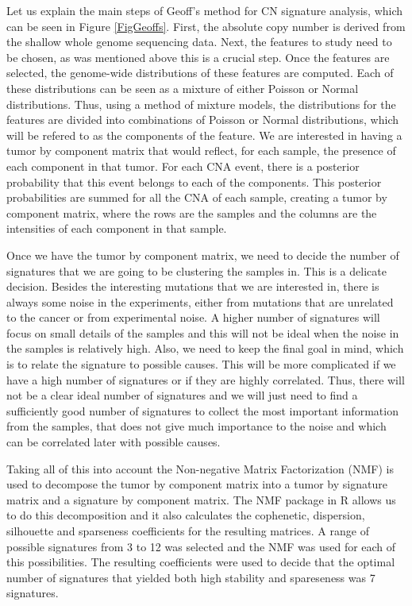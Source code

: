 \documentclass[a4paper]{article}
\begin{document}
Let us explain the main steps of Geoff's method for CN signature analysis, which can be seen in Figure \ref{FigGeoffs}. First, the absolute copy number is derived from the shallow whole genome sequencing data. Next, the features to study need to be chosen, as was mentioned above this is a crucial step. Once the features are selected, the genome-wide distributions of these features are computed. Each of these distributions can be seen as a mixture of either Poisson or Normal distributions. Thus, using a method of mixture models, the distributions for  the features are divided into combinations of Poisson or Normal distributions, which will be refered to as the components of the feature.  We are interested in having  a tumor by component matrix that would reflect, for each sample, the presence of each component in that tumor. For each CNA event, there is a posterior probability that this event belongs to each of the components. This posterior probabilities are summed for all the CNA of each sample, creating a tumor by component matrix, where the rows are the samples and the columns are the intensities of each component in that sample. 

Once we have the tumor by component matrix, we need to decide the number of signatures that we are going to be clustering the samples in. This is a delicate decision. Besides the interesting mutations that we are interested in, there is always some noise in the experiments, either from mutations that are unrelated to the cancer or from experimental noise. A higher number of signatures will focus on small details of the samples and this will not be ideal when the noise in the samples is relatively high. Also, we need to keep the final goal in mind, which is to relate the signature to possible causes. This will be more complicated if we have a high number of signatures or if they are highly correlated. Thus, there will not be a clear ideal number of signatures and we will just need to find a sufficiently good number of signatures to collect the most important information from the samples, that does not give much importance to the noise and which can be correlated later with possible causes. 

 Taking all of this into account the Non-negative Matrix Factorization (NMF) is used to decompose the tumor by component matrix into a tumor by signature matrix and a signature by component matrix. The NMF package in R \cite{NMFR} allows us to do this decomposition and it also calculates the cophenetic, dispersion, silhouette and sparseness coefficients for the resulting matrices. A range of possible signatures from 3 to 12 was selected and the NMF was used for each of this possibilities. The resulting coefficients were used to decide that the optimal number of signatures that yielded both high stability and spareseness was 7 signatures. 
 
\end{document}
